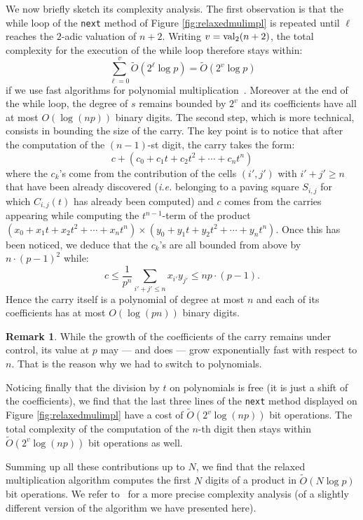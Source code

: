\documentclass[11pt]{article}
\numberwithin{equation}{section}
\numberwithin{figure}{section}
\renewcommand{\leq}{\leqslant}
\renewcommand{\geq}{\geqslant}
\theoremstyle{definition}
\newtheorem{rem}[theo]{Remark}
\newcommand{\val}{\text{\rm val}}
\newcommand{\softO}{\tilde O}
\begin{document}
We now briefly sketch its complexity analysis.
The first observation is that the while loop of the \texttt{next} method 
of Figure \ref{fig:relaxedmulimpl} is repeated until $\ell$ reaches the 
$2$-adic valuation of $n+2$. Writing $v = \val_2(n+2)$, the total 
complexity for the execution of the while loop therefore stays within: 
$$\sum_{\ell=0}^v \softO(2^\ell \log p) = \softO(2^v \log p)$$
if we use fast algorithms for polynomial multiplication~\cite[\S 8]{GaGe03}.
Moreover at the end of the while loop, the degree of $s$ remains 
bounded by $2^v$ and its coefficients have all at most $O(\log(np))$
binary digits.
The second step, which is more technical, consists in bounding the 
size of the carry. The key point is to notice that after the computation
of the $(n{-}1)$-st digit, the carry takes the form:
$$c + (c_0 + c_1 t + c_2 t^2 + \cdots + c_n t^n)$$
where the $c_k$'s come from the contribution of the cells $(i',j')$ with 
$i' + j' \geq n$ that have been already discovered (\emph{i.e.} belonging 
to a paving square $S_{i,j}$ for which $C_{i,j}(t)$ has already been
computed) and $c$ comes from the carries appearing while computing the
$t^{n-1}$-term of the product
$(x_0 + x_1 t + x_2 t^2 + \cdots + x_n t^n) \times
(y_0 + y_1 t + y_2 t^2 + \cdots + y_n t^n)$.
Once this has been noticed, we deduce that the $c_k$'s are
all bounded from above by $n\cdot (p{-}1)^2$ while:
$$c \leq \frac 1 {p^n} \sum_{i'+j' \leq n} x_{i'} y_{j'}
\leq np\cdot (p{-}1).$$
Hence the carry itself is a polynomial of degree at most $n$ and each
of its coefficients has at most $O(\log(pn))$ binary digits.

\begin{rem}
\label{rem:carry}
While the growth of the coefficients of the carry remains under 
control, its value at $p$ may --- and does --- grow exponentially fast 
with respect to $n$. That is the reason why we had to switch to 
polynomials.
\end{rem}

Noticing finally that the division by $t$ on polynomials is free (it is 
just a shift of the coefficients), we find that the last three lines 
of the \texttt{next} method displayed on Figure
\ref{fig:relaxedmulimpl} have a cost of $\softO(2^v \log(np))$ bit
operations. The total complexity of the computation of the $n$-th
digit then stays within $\softO(2^v \log(np))$ bit operations as well.

Summing up all these contributions up to $N$, we find that the relaxed 
multiplication algorithm computes the first $N$ digits of a product in 
$\softO(N \log p)$ bit operations.
We refer to~\cite{BeHoLe11} for a more precise complexity analysis (of a 
slightly different version of the algorithm we have presented here).
\end{document}
